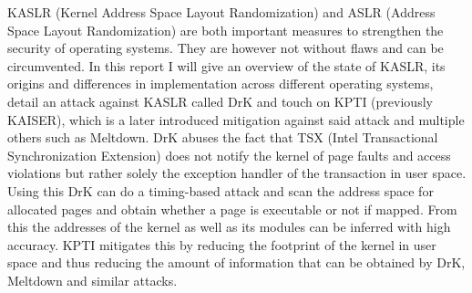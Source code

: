 KASLR (Kernel Address Space Layout Randomization) and ASLR (Address Space Layout Randomization) are both important measures to strengthen the security of operating systems.
They are however not without flaws and can be circumvented.
In this report I will give an overview of the state of KASLR, its origins and differences in implementation across different operating systems, detail an attack against KASLR called DrK and touch on KPTI (previously KAISER), which is a later introduced mitigation against said attack and multiple others such as Meltdown.
DrK abuses the fact that TSX (Intel Transactional Synchronization Extension) does not notify the kernel of page faults and access violations but rather solely the exception handler of the transaction in user space. Using this DrK can do a timing-based attack and scan the address space for allocated pages and obtain whether a page is executable or not if mapped.
From this the addresses of the kernel as well as its modules can be inferred with high accuracy.
KPTI mitigates this by reducing the footprint of the kernel in user space and thus reducing the amount of information that can be obtained by DrK, Meltdown and similar attacks.

